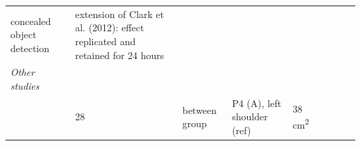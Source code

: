 \documentclass[11pt,]{memoir}
\begin{document}
\begin{longtable}[]{@{}lllllllll@{}}
\begin{minipage}[t]{0.06\columnwidth}
concealed
object
detection\strut
\end{minipage} & \begin{minipage}[t]{0.25\columnwidth}\raggedright
extension of Clark et al. (2012): effect
replicated and retained for 24 hours\strut
\end{minipage}\tabularnewline
\begin{minipage}[t]{0.08\columnwidth}\raggedright
\emph{Other studies}\strut
\end{minipage} & \begin{minipage}[t]{0.03\columnwidth}\raggedright
\strut
\end{minipage} & \begin{minipage}[t]{0.05\columnwidth}\raggedright
\strut
\end{minipage} & \begin{minipage}[t]{0.15\columnwidth}\raggedright
\strut
\end{minipage} & \begin{minipage}[t]{0.04\columnwidth}\raggedright
\strut
\end{minipage} & \begin{minipage}[t]{0.06\columnwidth}\raggedright
\strut
\end{minipage} & \begin{minipage}[t]{0.05\columnwidth}\raggedright
\strut
\end{minipage} & \begin{minipage}[t]{0.06\columnwidth}\raggedright
\strut
\end{minipage} & \begin{minipage}[t]{0.25\columnwidth}\raggedright
\strut
\end{minipage}\tabularnewline
\begin{minipage}[t]{0.08\columnwidth}\raggedright
\textcite{Callan2016}\strut
\end{minipage} & \begin{minipage}[t]{0.03\columnwidth}\raggedright
28\strut
\end{minipage} & \begin{minipage}[t]{0.05\columnwidth}\raggedright
between
group\strut
\end{minipage} & \begin{minipage}[t]{0.15\columnwidth}\raggedright
P4 (A), left shoulder (ref)\strut
\end{minipage} & \begin{minipage}[t]{0.04\columnwidth}\raggedright
38
cm\textsuperscript{2}\strut
\end{minipage} & \begin{minipage}[t]{0.06\columnwidth}\raggedright

\end{minipage}
\end{longtable}
\end{document}
